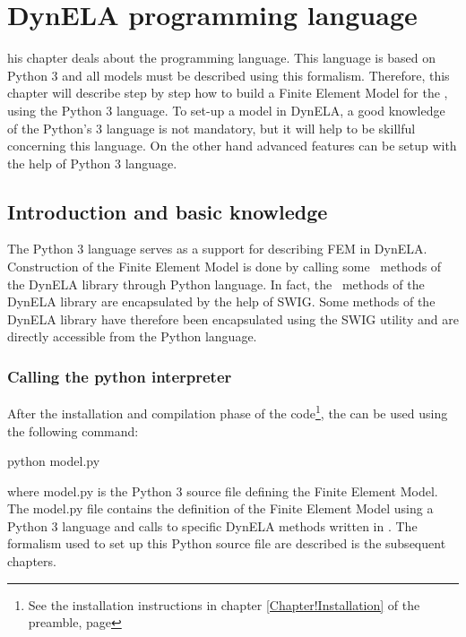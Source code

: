 %
%
%
\chapter{DynELA programming language}

\startcontents[chapters]
\printmyminitoc[2]his chapter deals about the \DynELA programming language. This language is based on Python 3 and all models must be described using this formalism. Therefore, this chapter will describe step by step how to build a Finite Element Model for the \DynELA, using the Python 3 language. To set-up a model in DynELA, a good knowledge of the Python's 3 language is not mandatory, but it will help to be skillful concerning this language. On the other hand advanced features can be setup with the help of Python 3 language.

\section{Introduction and basic knowledge}
The Python 3 language serves as a support for describing FEM in DynELA. Construction of the Finite Element Model is done by calling some \Cpp~methods of the DynELA library through Python language. In fact, the \Cpp~methods of the DynELA library are encapsulated by the help of SWIG. Some methods of the DynELA library have therefore been encapsulated using the SWIG utility and are directly accessible from the Python language.

\subsection{Calling the python interpreter}

After the installation and compilation phase of the code\footnote{See the installation instructions in chapter \ref{Chapter!Installation} of the preamble, page \pageref{Chapter!Installation}}, the \DynELA can be used using the following command:

\begin{BashListing}
python model.py
\end{BashListing}

where \textsf{model.py} is the Python 3 source file defining the Finite Element Model. The \textsf{model.py} file contains the definition of the Finite Element Model using a Python 3 language and calls to specific DynELA methods written in \Cpp. The formalism used to set up this Python source file are described is the subsequent chapters.

